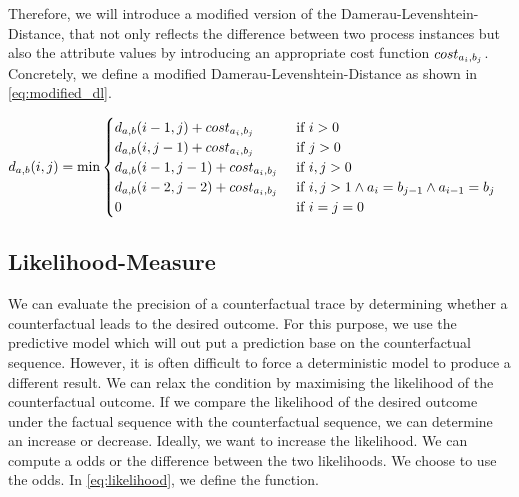 \documentclass[./../../paper.tex]{subfiles}
\begin{document}

\noindent Therefore, we will introduce a modified version of the Damerau-Levenshtein-Distance, that not only reflects the difference between two process instances but also the attribute values by introducing an appropriate cost function $cost_{a_i, b_j}$. Concretely, we define a modified Damerau-Levenshtein-Distance as shown in  \autoref{eq:modified_dl}.

\begin{align}
    \label{eq:modified_dl}
    d_{a, b}(i, j) & =\min
    \begin{cases}
        d_{a, b}(i-1, j  )+cost_{a_i, b_j} & \text { if } i>0                                            \\
        d_{a, b}(i  , j-1)+cost_{a_i, b_j} & \text { if } j>0                                            \\
        d_{a, b}(i-1, j-1)+cost_{a_i, b_j} & \text { if } i, j>0                                         \\
        d_{a, b}(i-2, j-2)+cost_{a_i, b_j} & \text { if } i, j>1 \land a_{i}=b_{j-1} \land a_{i-1}=b_{j} \\
        0                                 & \text { if } i=j=0                                          
    \end{cases} 
\end{align}


\subsection{Likelihood-Measure}
We can evaluate the precision of a counterfactual trace by determining whether a counterfactual leads to the desired outcome. For this purpose, we use the predictive model which will out put a prediction base on the counterfactual sequence. However, it is often difficult to force a deterministic model to produce a different result. We can relax the condition by maximising the likelihood of the counterfactual outcome. If we compare the likelihood of the desired outcome under the factual sequence with the counterfactual sequence, we can determine an increase or decrease. Ideally, we want to increase the likelihood. We can compute a odds or the difference between the two likelihoods. We choose to use the odds. In \autoref{eq:likelihood}, we define the function.
\end{document}
